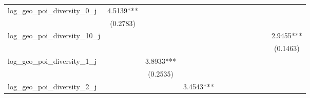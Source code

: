 \begin{table}
\begin{center}
\begin{tabular}{lccccccccccc}
log\_geo\_poi\_diversity\_0\_j  & 4.5139***             &                        &                         &                          &                           &                            &                             &                              &                               &                                &                                  \\
                                & (0.2783)              &                        &                         &                          &                           &                            &                             &                              &                               &                                &                                  \\
log\_geo\_poi\_diversity\_10\_j &                       &                        &                         &                          &                           &                            &                             &                              &                               &                                & 2.9455***                        \\
                                &                       &                        &                         &                          &                           &                            &                             &                              &                               &                                & (0.1463)                         \\
log\_geo\_poi\_diversity\_1\_j  &                       & 3.8933***              &                         &                          &                           &                            &                             &                              &                               &                                &                                  \\
                                &                       & (0.2535)               &                         &                          &                           &                            &                             &                              &                               &                                &                                  \\
log\_geo\_poi\_diversity\_2\_j  &                       &                        & 3.4543***               &                          &                           &                            &                             &                              &                               &                                &                                  \\

\end{tabular}
\end{center}
\end{table}
